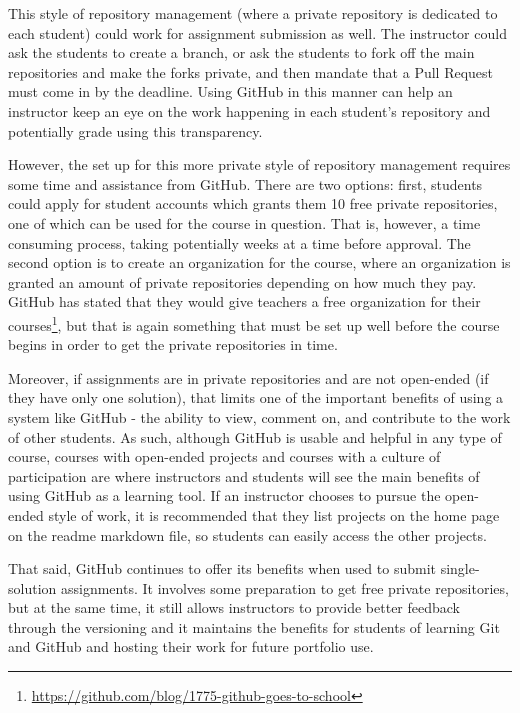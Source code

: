 This style of repository management (where a private repository is dedicated to each student) could work for assignment submission as well. The instructor could ask the students to create a branch, or ask the students to fork off the main repositories and make the forks private, and then mandate that a Pull Request must come in by the deadline. Using GitHub in this manner can help an instructor keep an eye on the work happening in each student's repository and potentially grade using this transparency.

However, the set up for this more private style of repository management requires some time and assistance from GitHub. There are two options: first, students could apply for student accounts which grants them 10 free private repositories, one of which can be used for the course in question. That is, however, a time consuming process, taking potentially weeks at a time before approval. The second option is to create an organization for the course, where an organization is granted an amount of private repositories depending on how much they pay. GitHub has stated that they would give teachers a free organization for their courses\footnote{\url{https://github.com/blog/1775-github-goes-to-school}}, but that is again something that must be set up well before the course begins in order to get the private repositories in time.

Moreover, if assignments are in private repositories and are not open-ended (if they have only one solution), that limits one of the important benefits of using a system like GitHub - the ability to view, comment on, and contribute to the work of other students. As such, although GitHub is usable and helpful in any type of course, courses with open-ended projects and courses with a culture of participation are where instructors and students will see the main benefits of using GitHub as a learning tool. If an instructor chooses to pursue the open-ended style of work, it is recommended that they list projects on the home page on the readme markdown file, so students can easily access the other projects.

That said, GitHub continues to offer its benefits when used to submit single-solution assignments. It involves some preparation to get free private repositories, but at the same time, it still allows instructors to provide better feedback through the versioning and it maintains the benefits for students of learning Git and GitHub and hosting their work for future portfolio use. \\

